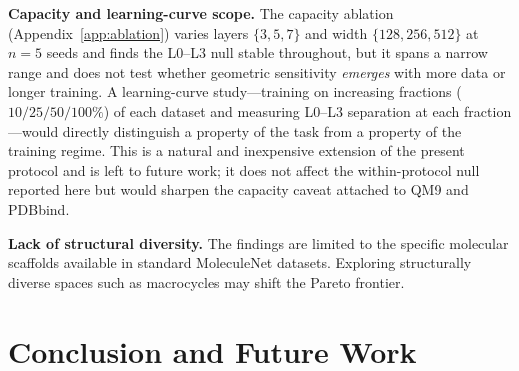 \documentclass[pdflatex,sn-vancouver-num]{sn-jnl}%
\theoremstyle{thmstyleone}%
\theoremstyle{thmstyletwo}%
\theoremstyle{thmstylethree}%
\begin{document}
\textbf{Capacity and learning-curve scope.}  The capacity ablation (Appendix~\ref{app:ablation}) varies layers $\{3,5,7\}$ and width $\{128,256,512\}$ at $n{=}5$ seeds and finds the L0--L3 null stable throughout, but it spans a narrow range and does not test whether geometric sensitivity \emph{emerges} with more data or longer training.  A learning-curve study---training on increasing fractions ($10/25/50/100\%$) of each dataset and measuring L0--L3 separation at each fraction---would directly distinguish a property of the task from a property of the training regime.  This is a natural and inexpensive extension of the present protocol and is left to future work; it does not affect the within-protocol null reported here but would sharpen the capacity caveat attached to QM9 and PDBbind.

\textbf{Lack of structural diversity.} The findings are limited to the specific molecular scaffolds available in standard MoleculeNet datasets. Exploring structurally diverse spaces such as macrocycles may shift the Pareto frontier.



\section{Conclusion and Future Work}
\label{sec:conclusion_future}
\end{document}
